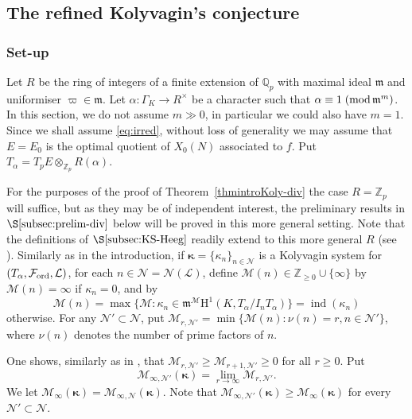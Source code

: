 \documentclass[10pt,reqno]{amsart}
\numberwithin{equation}{section}
\theoremstyle{plain}
\theoremstyle{definition}
\theoremstyle{definition}
\theoremstyle{plain}
\theoremstyle{plain}
\theoremstyle{plain}
\theoremstyle{plain}
\theoremstyle{plain}
\theoremstyle{plain}
\newcommand{\ind}{\operatorname{ind}}
\newcommand{\Z}{\mathbb{Z}}
\newcommand{\Q}{\mathbb{Q}}
\newcommand{\p}{\mathfrak{P}}
\newcommand{\bkappa}{\boldsymbol{\kappa}}
\newcommand{\sha}{\text{\wncyr{W}}}
\newcommand{\Fcal}{\mathcal{F}}
\newcommand{\cN}{\mathcal{N}}
\newcommand{\fm}{\mathfrak{m}}
\newcommand{\rH}{\mathrm{H}}
\begin{document}
\subsection{The refined Kolyvagin's conjecture}
\subsubsection{Set-up} Let $R$ be the ring of integers of a finite extension of $\Q_p$ with maximal ideal $\fm$ and uniformiser $\varpi\in\fm$. Let $\alpha: \Gamma_{K}\to R^{\times}$ be a character such that $\alpha\equiv 1\;({\rm mod}\,\fm^m)$.
%
%
In this section, we do not assume $m\gg 0$, in particular we could also have $m=1$. Since we shall assume \eqref{eq:irred}, without loss of generality we may assume that $E=E_0$ is the optimal quotient of $X_0(N)$ associated to $f$. Put $T_{\alpha}=T_pE\otimes_{\Z_p} R(\alpha)$. 

For the purposes of the proof of Theorem~\ref{thmintroKoly-div} the case $R=\Z_p$ will suffice, but as they may be of independent interest, the preliminary results in $\S\ref{subsec:prelim-div}$ below will be proved in this more general setting. Note that the definitions of $\S\ref{subsec:KS-Heeg}$ readily extend to this more general $R$ (see \cite[\S\S{3.2-3}]{eisenstein}). Similarly as in the introduction, if $\boldsymbol{\kappa}=\{\kappa_n\}_{n\in\cN}$ is a Kolyvagin system for 
$(T_\alpha,\Fcal_{\rm ord},\mathcal{L})$,
for each $n\in\mathcal{N}=\mathcal{N}(\mathcal{L})$, define $\mathscr{M}(n)\in\Z_{\geq 0}\cup\{\infty\}$ by $\mathscr{M}(n)=\infty$ if $\kappa_n=0$, and by
\[
\mathscr{M}(n)=\max\{\mathscr{M}\colon\kappa_n\in \fm^{\mathscr{M}}\rH^1(K,T_\alpha/I_nT_\alpha)\}=\ind(\kappa_n)
\]
otherwise. For any $\cN'\subset \cN$, put $\mathscr{M}_{r,\cN'}=\min\{\mathscr{M}(n)\colon\nu(n)=r, n\in\cN'\}$, where $\nu(n)$ denotes the number of prime factors of $n$. 

One shows, similarly as in \cite{kolystructure}, that $\mathscr{M}_{r,\cN'}\geq\mathscr{M}_{r+1,\cN'}\geq 0$ for all $r\geq 0$. Put 
\[
\mathscr{M}_{\infty,\cN'}(\bkappa)=\lim_{r\to\infty}\mathscr{M}_{r,\cN'}.
\]
We let $\mathscr{M}_{\infty}(\boldsymbol{\kappa})=\mathscr{M}_{\infty,\cN}(\boldsymbol{\kappa})$. Note that $\mathscr{M}_{\infty,\cN'}(\bkappa)\geq  \mathscr{M}_{\infty}(\boldsymbol{\kappa})$ for every $\cN'\subset \cN$.
\end{document}
